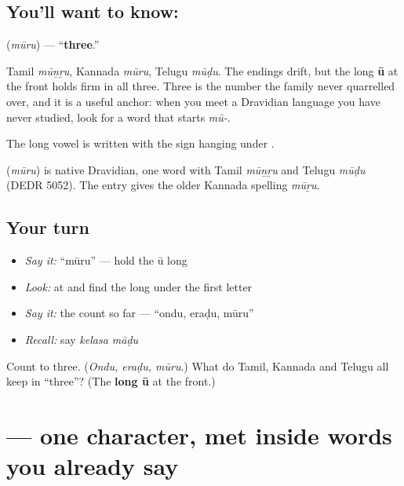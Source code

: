 \subsection*{You'll want to know: }
\textbf{} (\emph{mūru}) — \textquotedblleft{}\textbf{three}.\textquotedblright{}

Tamil \emph{mūṉṟu}, Kannada \emph{mūru}, Telugu \emph{mūḍu}. The endings drift, but the long \textbf{ū} at the front holds firm in all three. Three is the number the family never quarrelled over, and it is a useful anchor: when you meet a Dravidian language you have never studied, look for a word that starts \emph{mū-}.

The long vowel is written with the sign \textbf{} hanging under .

\begin{cousinweb}
\textbf{} (\emph{mūru}) is native Dravidian, one word with Tamil \emph{mūṉṟu} and Telugu \emph{mūḍu} (DEDR 5052). The entry gives the older Kannada spelling \emph{mūṟu}.
\end{cousinweb}

\subsection*{Your turn}
\begin{itemize}
\raggedright
  \item \emph{Say it:} \textquotedblleft{}mūru\textquotedblright{} — hold the ū long
  \item \emph{Look:} at  and find the long  under the first letter
  \item \emph{Say it:} the count so far — \textquotedblleft{}ondu, eraḍu, mūru\textquotedblright{}
  \item \emph{Recall:} say \emph{kelasa māḍu}
\end{itemize}

\begin{tcolorbox}[breakable,colback=teal!4,colframe=teal!35!black,title={Before you move on}]
Count to three. (\emph{Ondu, eraḍu, mūru}.) What do Tamil, Kannada and Telugu all keep in \textquotedblleft{}three\textquotedblright{}? (The \textbf{long ū} at the front.)
\end{tcolorbox}
\section[\texorpdfstring{\kn{ರ} (ra)}{ರ (ra)}]{ — one character, met inside words you already say}

